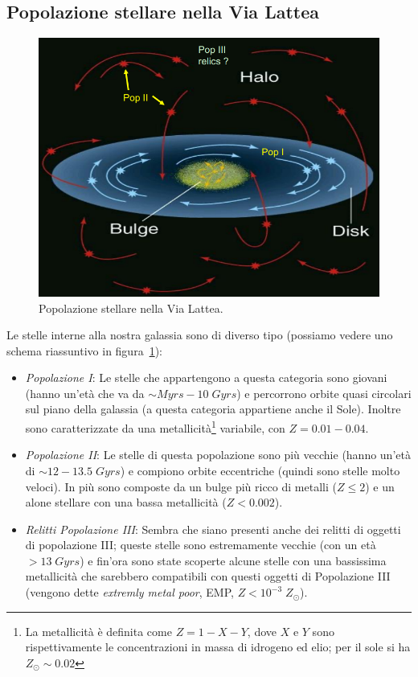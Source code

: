 \subsection{Popolazione stellare nella Via Lattea} \label{pop-stellare-via-lattea}
\begin{figure}
    \centering
    \includegraphics[width = 0.5 \textwidth]{immagini/popolazione-stellare-via-lattea.png}
    \caption{Popolazione stellare nella Via Lattea.}
    \label{fig:popolazione-stellare-via-lattea}
\end{figure}
Le stelle interne alla nostra galassia sono di diverso tipo (possiamo vedere uno schema riassuntivo in figura~\ref{fig:popolazione-stellare-via-lattea}):
\begin{itemize}
    \item \emph{Popolazione I}: Le stelle che appartengono a questa categoria sono giovani (hanno un'età che va da $\sim \si{Myrs} - 10 \;\si{Gyrs}$) e percorrono orbite quasi circolari sul piano della galassia (a questa categoria appartiene anche il Sole). Inoltre sono caratterizzate da una metallicità\footnote{La metallicità è definita come $Z = 1-X-Y$, dove $X$ e $Y$ sono rispettivamente le concentrazioni in massa di idrogeno ed elio; per il sole si ha $Z_{\odot}\sim 0.02$} variabile, con $Z=0.01-0.04$. 
    \item \emph{Popolazione II}: Le stelle di questa popolazione sono più vecchie (hanno un'età di $\sim 12 - 13.5 \; \si{Gyrs}$) e compiono orbite eccentriche (quindi sono stelle molto veloci). In più sono composte da un bulge più ricco di metalli ($Z \leq 2$) e un alone stellare con una bassa metallicità ($Z < 0.002$).
    \item \emph{Relitti Popolazione III}: Sembra che siano presenti anche dei relitti di oggetti di popolazione III; queste stelle sono estremamente vecchie (con un età $> 13 \; \si{Gyrs}$) e fin'ora sono state scoperte alcune stelle con una bassissima metallicità che sarebbero compatibili con questi oggetti di Popolazione III (vengono dette \emph{extremly metal poor}, EMP, $Z < 10^{-3} \;Z_{\odot}$).
\end{itemize}

